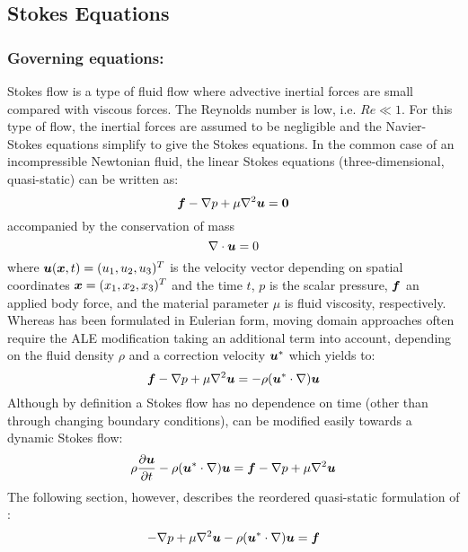 \subsection{Stokes Equations}

\subsubsection{Governing equations:}

Stokes flow is a type of fluid flow where advective inertial forces are small compared with viscous forces. The Reynolds number is low, i.e. $\textit{Re}\ll 1$. For this type of flow, the inertial forces are assumed to be negligible and the Navier-Stokes equations simplify to give the Stokes equations. In the common case of an incompressible Newtonian fluid, the linear Stokes equations (three-dimensional, quasi-static) can be written as:
\begin{equation}
    \vect{f}-\grad{p}+\mu\laplacian{\vect{u}}=\vect{0}
  \label{eqn:Stokesequation1}
\end{equation}
accompanied by the conservation of mass
\begin{equation}
  \diverg{\vect{u}}=0
  \label{eqn:Stokesmasequation}
\end{equation}
where $\vect{u}(\vect{x},t)=(u_1,u_2,u_3)^T$ is the velocity vector depending on spatial coordinates $\vect{x}=(x_1,x_2,x_3)^T$ and the time $t$, $p$ is the scalar pressure, $\vect{f}$ an applied body force, and the material parameter $\mu$ is fluid viscosity, respectively. Whereas  has been formulated in Eulerian form, moving domain approaches often require the ALE modification taking an additional term into account, depending on the fluid density $\rho$ and a correction velocity $\vect{u}^*$ which yields to:
\begin{equation}
    \vect{f}-\grad{p}+\mu\laplacian{\vect{u}}=-\rho(\vect{u}^*\cdot\grad)\vect{u}
  \label{eqn:StokesequationALE}
\end{equation}
Although by definition a Stokes flow has no dependence on time (other than through changing boundary conditions),  can be modified easily towards a dynamic Stokes flow:
\begin{equation}
    \rho\delby{\vect{u}}{t}-\rho(\vect{u}^*\cdot\grad)\vect{u}=\vect{f}-\grad{p}+\mu\laplacian{\vect{u}}
  \label{eqn:Stokesequation2}
\end{equation}
The following section, however, describes the reordered quasi-static formulation of  :
\begin{equation}
    -\grad{p}+\mu\laplacian{\vect{u}}-\rho(\vect{u}^*\cdot\grad)\vect{u}=\vect{f}
  \label{eqn:StokesequationALE2}
\end{equation}

